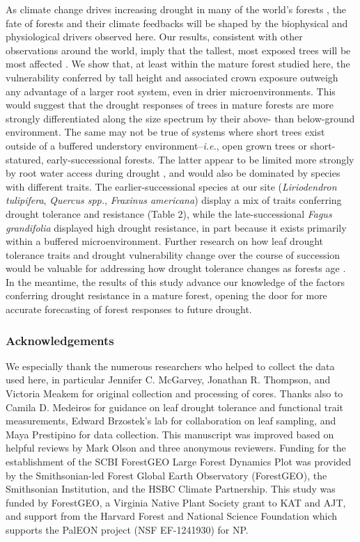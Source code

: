 \documentclass[
]{article}
\begin{document}
As climate change drives increasing drought in many of the world's
forests
\citep{trenberth_global_2014, intergovernmental_panel_on_climate_change_climate_2015},
the fate of forests and their climate feedbacks will be shaped by the
biophysical and physiological drivers observed here. Our results,
consistent with other observations around the world, imply that the
tallest, most exposed trees will be most affected
\citep{bennett_larger_2015, stovall_tree_2019}. We show that, at least
within the mature forest studied here, the vulnerability conferred by
tall height and associated crown exposure outweigh any advantage of a
larger root system, even in drier microenvironments. This would suggest
that the drought responses of trees in mature forests are more strongly
differentiated along the size spectrum by their above- than below-ground
environment. The same may not be true of systems where short trees exist
outside of a buffered understory environment--\emph{i.e.}, open grown
trees or short-statured, early-successional forests. The latter appear
to be limited more strongly by root water access during drought
\citep{bretfeld_plant_2018}, and would also be dominated by species with
different traits. The earlier-successional species at our site
(\emph{Liriodendron tulipifera}, \emph{Quercus spp.}, \emph{Fraxinus
americana}) display a mix of traits conferring drought tolerance and
resistance (Table 2), while the late-successional \emph{Fagus
grandifolia} displayed high drought resistance, in part because it
exists primarily within a buffered microenvironment. Further research on
how leaf drought tolerance traits and drought vulnerability change over
the course of succession would be valuable for addressing how drought
tolerance changes as forests age
\citep[e.g.~][]{rodriguez-caton_long-term_2015}. In the meantime, the
results of this study advance our knowledge of the factors conferring
drought resistance in a mature forest, opening the door for more
accurate forecasting of forest responses to future drought.

\hypertarget{acknowledgements}{%
\subsubsection{Acknowledgements}\label{acknowledgements}}

We especially thank the numerous researchers who helped to collect the
data used here, in particular Jennifer C. McGarvey, Jonathan R.
Thompson, and Victoria Meakem for original collection and processing of
cores. Thanks also to Camila D. Medeiros for guidance on leaf drought
tolerance and functional trait measurements, Edward Brzostek's lab for
collaboration on leaf sampling, and Maya Prestipino for data collection.
This manuscript was improved based on helpful reviews by Mark Olson and
three anonymous reviewers. Funding for the establishment of the SCBI
ForestGEO Large Forest Dynamics Plot was provided by the Smithsonian-led
Forest Global Earth Observatory (ForestGEO), the Smithsonian
Institution, and the HSBC Climate Partnership. This study was funded by
ForestGEO, a Virginia Native Plant Society grant to KAT and AJT, and
support from the Harvard Forest and National Science Foundation which
supports the PalEON project (NSF EF-1241930) for NP.
\end{document}
